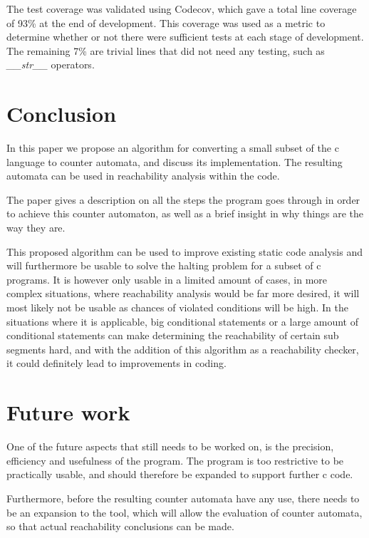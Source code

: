 \documentclass[12pt]{article}
\begin{document}
The test coverage was validated using Codecov, which gave a total line coverage of 93\% at the end of development. This coverage was used as a metric to determine whether or not there were sufficient tests at each stage of development. The remaining 7\% are trivial lines that did not need any testing, such as \textit{\_\_str\_\_} operators.

\section{Conclusion}
In this paper we propose an algorithm for converting a small subset of the c language to counter automata, and discuss its implementation. The resulting automata can be used in reachability analysis within the code. 

The paper gives a description on all the steps the program goes through in order to achieve this counter automaton, as well as a brief insight in why things are the way they are.

This proposed algorithm can be used to improve existing static code analysis and will furthermore be usable to solve the halting problem for a subset of c programs. It is however only usable in a limited amount of cases, in more complex situations, where reachability analysis would be far more desired, it will most likely not be usable as chances of violated conditions will be high. In the situations where it is applicable, big conditional statements or a large amount of conditional statements can make determining the reachability of certain sub segments hard, and with the addition of this algorithm as a reachability checker, it could definitely lead to improvements in coding.

\section{Future work}
One of the future aspects that still needs to be worked on, is the precision, efficiency and usefulness of the program. The program is too restrictive to be practically usable, and should therefore be expanded to support further c code.

Furthermore, before the resulting counter automata have any use, there needs to be an expansion to the tool, which will allow the evaluation of counter automata, so that actual reachability conclusions can be made.
\printbibliography
\end{document}
